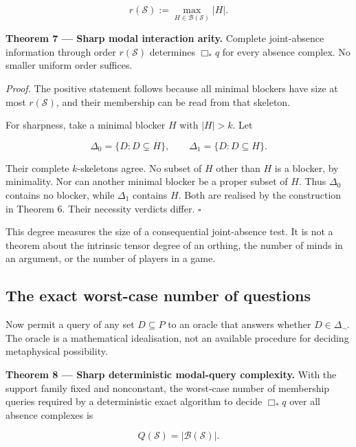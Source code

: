 \documentclass[11pt,a4paper]{article}
\begin{document}
\nopagebreak[4]

\[
 r(\mathscr S):=\max_{H\in\mathscr B(\mathscr S)}|H|.
\]


\textbf{Theorem 7 --- Sharp modal interaction arity.} Complete
joint-absence information through order \(r(\mathscr S)\) determines
\(\Box_*q\) for every absence complex. No smaller uniform order
suffices.

\emph{Proof.} The positive statement follows because all minimal
blockers have size at most \(r(\mathscr S)\), and their membership can
be read from that skeleton.

For sharpness, take a minimal blocker \(H\) with \(|H|>k\). Let

\nopagebreak[4]

\[
\Delta_0=\{D:D\subsetneq H\},\qquad
\Delta_1=\{D:D\subseteq H\}.
\]

Their complete \(k\)-skeletons agree. No subset of \(H\) other than
\(H\) is a blocker, by minimality. Nor can another minimal blocker be a
proper subset of \(H\). Thus \(\Delta_0\) contains no blocker, while
\(\Delta_1\) contains \(H\). Both are realised by the construction in
Theorem 6. Their necessity verdicts differ. \(\square\)

This degree measures the size of a consequential joint-absence test. It
is not a theorem about the intrinsic tensor degree of an orthing, the
number of minds in an argument, or the number of players in a game.

\subsection{The exact worst-case number of
questions}\label{the-exact-worst-case-number-of-questions}

Now permit a query of any set \(D\subseteq P\) to an oracle that answers
whether \(D\in\Delta_{\neg}\). The oracle is a mathematical
idealisation, not an available procedure for deciding metaphysical
possibility.


\textbf{Theorem 8 --- Sharp deterministic modal-query complexity.} With
the support family fixed and nonconstant, the worst-case number of
membership queries required by a deterministic exact algorithm to decide
\(\Box_*q\) over all absence complexes is

\nopagebreak[4]

\[
\boxed{Q(\mathscr S)=|\mathscr B(\mathscr S)|.}
\]
\end{document}
